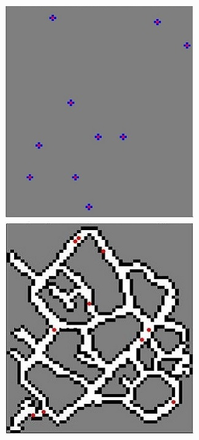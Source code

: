 \documentclass[letterpaper, 9 pt, conference]{ieeeconf}  %
\begin{document}
\begin{figure}

	\includegraphics[width=0.1\paperheight]{2D_720_initial.jpg}
	\includegraphics[width=0.1\paperheight]{10particles_final.jpg}
	

\end{figure}
\end{document}
